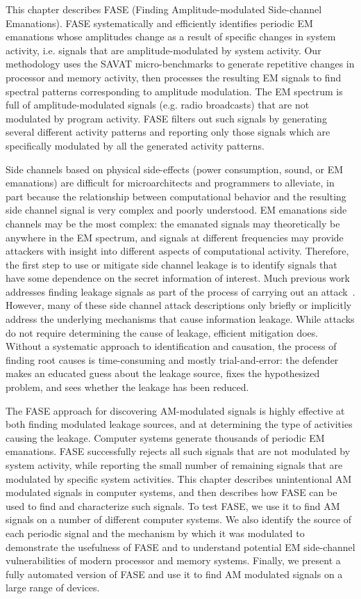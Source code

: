 This chapter describes FASE (Finding Amplitude-modulated Side-channel Emanations). FASE systematically and efficiently identifies periodic EM emanations whose amplitudes change as a result of specific changes in system activity, i.e. signals that are amplitude-modulated by system activity. Our methodology uses the SAVAT micro-benchmarks to generate repetitive changes in processor and memory activity, then processes the resulting EM signals to find spectral patterns corresponding to amplitude modulation. The EM spectrum is full of amplitude-modulated signals (e.g. radio broadcasts) that are not modulated by program activity. FASE filters out such signals by generating several different activity patterns and reporting only those signals which are specifically modulated by all the generated activity patterns. 

Side channels based on physical side-effects (power consumption, sound, or EM emanations) are difficult for microarchitects and programmers to alleviate, in part because the relationship between computational behavior and the resulting side channel signal is very complex and poorly understood. EM emanations side channels may be the most complex: the emanated signals may theoretically be anywhere in the EM spectrum, and signals at different frequencies may provide attackers with insight into different aspects of computational activity.  Therefore, the first step to use or mitigate side channel leakage is to identify signals that have some dependence on the secret information of interest. Much previous work addresses finding leakage signals as part of the process of carrying out an attack~\cite{Kocher99,gebotys2005,meynard2011,sugawara2009}. However, many of these side channel attack descriptions only briefly or implicitly address the underlying mechanisms that cause information leakage. While attacks do not require determining the cause of leakage, efficient mitigation does. Without a systematic approach to identification and causation, the process of finding root causes is time-consuming and mostly trial-and-error: the defender makes an educated guess about the leakage source, fixes the hypothesized problem, and sees whether the leakage has been reduced.

The FASE approach for discovering AM-modulated signals is highly effective at both finding modulated leakage sources, and at determining the type of activities causing the leakage. Computer systems generate thousands of periodic EM emanations. FASE successfully rejects all such signals that are not modulated by system activity, while reporting the small number of remaining signals that are modulated by specific system activities. This chapter describes unintentional AM modulated signals in computer systems, and then describes how FASE can be used to find and characterize such signals. To test FASE, we use it to find AM signals on a number of different computer systems. We also identify the source of each periodic signal and the mechanism by which it was modulated to demonstrate the usefulness of FASE and to understand potential EM side-channel vulnerabilities of modern processor and memory systems. Finally, we present a fully automated version of FASE and use it to find AM modulated signals on a large range of devices.
